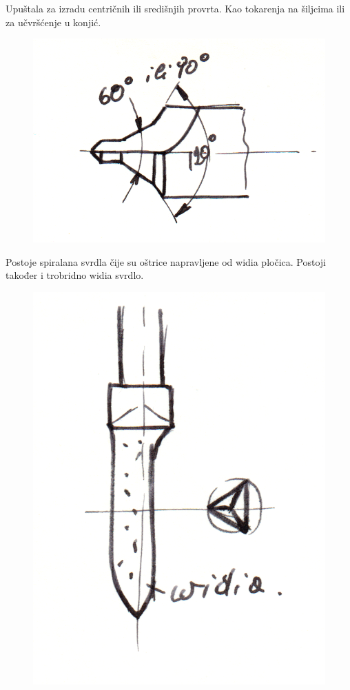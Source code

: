 \documentclass[a4paper,12pt]{article}
\numberwithin{figure}{section}
\begin{document}
Upuštala za izradu centričnih ili središnjih provrta. Kao tokarenja na šiljcima ili za učvršćenje u konjić.
\begin{figure}[!h]
\centering
\includegraphics[scale=0.13]{image_25-1.png}
\end{figure}
\FloatBarrier
Postoje spiralana svrdla čije su oštrice napravljene od widia pločica. Postoji također i trobridno widia svrdlo.
\begin{figure}[!h]
\centering
\includegraphics[scale=0.1]{image_25-2.png}
\end{figure}
\FloatBarrier
\end{document}
